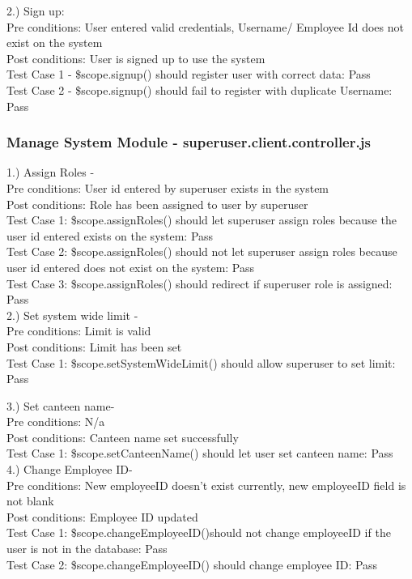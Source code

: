 \documentclass[a4paper,12pt]{article}
\begin{document}
2.) Sign up: \\
Pre conditions: User entered valid credentials, Username/ Employee Id does not exist on the system
\\ Post conditions: User is signed up to use the system \\
Test Case 1 - \$scope.signup()  should register user with correct data: Pass \\
Test Case 2 - \$scope.signup()  should fail to register with duplicate Username: Pass

\subsubsection{Manage System Module - superuser.client.controller.js }
1.) Assign Roles - \\
Pre conditions: User id entered by superuser exists in the system \\
Post conditions: Role has been assigned to user by superuser \\
Test Case 1: \$scope.assignRoles() should let superuser assign roles because the user id entered exists on the system: Pass
\\ Test Case 2:  \$scope.assignRoles() should not let superuser assign roles because user id entered does not exist on the system: Pass \\
Test Case 3: \$scope.assignRoles() should redirect if superuser role is assigned: Pass \\
 
2.) Set system wide limit - \\
Pre conditions: Limit is valid \\
Post conditions: Limit has been set \\
Test Case 1: \$scope.setSystemWideLimit() should allow superuser to set limit: Pass

3.) Set canteen name-\\
Pre conditions: N/a \\
Post conditions: Canteen name set successfully \\
Test Case 1: \$scope.setCanteenName()  should let user set canteen name: Pass \\

4.) Change Employee ID- \\
Pre conditions: New employeeID doesn't exist currently, new employeeID field is not blank \\
Post conditions: Employee ID updated \\
Test Case 1: \$scope.changeEmployeeID()should not change employeeID if the user is not in the database: Pass \\
Test Case 2: \$scope.changeEmployeeID() should change employee ID: Pass \\
\end{document}
